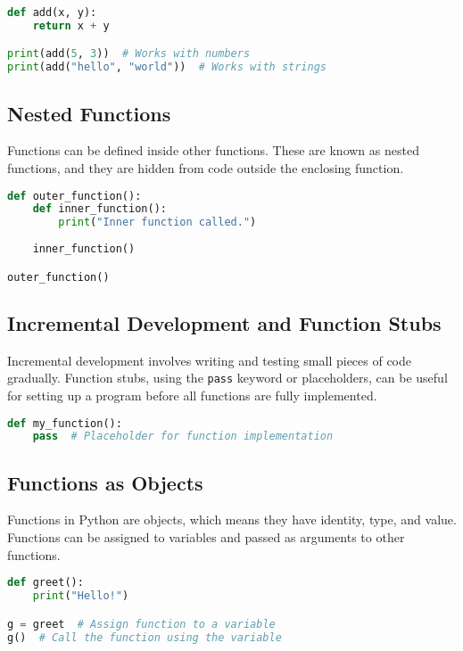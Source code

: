 \documentclass{article}
\begin{document}
\begin{lstlisting}[language=Python, caption={Polymorphic Function Example}]
def add(x, y):
    return x + y

print(add(5, 3))  # Works with numbers
print(add("hello", "world"))  # Works with strings
\end{lstlisting}

\subsection{Nested Functions}
Functions can be defined inside other functions. These are known as nested functions, and they are hidden from code outside the enclosing function.

\begin{lstlisting}[language=Python, caption={Nested Functions Example}]
def outer_function():
    def inner_function():
        print("Inner function called.")
    
    inner_function()

outer_function()
\end{lstlisting}

\subsection{Incremental Development and Function Stubs}
Incremental development involves writing and testing small pieces of code gradually. Function stubs, using the \lstinline|pass| keyword or placeholders, can be useful for setting up a program before all functions are fully implemented.

\begin{lstlisting}[language=Python, caption={Function Stub Example}]
def my_function():
    pass  # Placeholder for function implementation
\end{lstlisting}

\subsection{Functions as Objects}
Functions in Python are objects, which means they have identity, type, and value. Functions can be assigned to variables and passed as arguments to other functions.

\begin{lstlisting}[language=Python, caption={Assigning Functions to Variables}]
def greet():
    print("Hello!")

g = greet  # Assign function to a variable
g()  # Call the function using the variable
\end{lstlisting}
\end{document}
